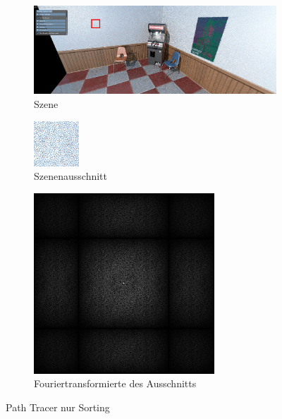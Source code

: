 \begin{figure}[H]

    \begin{subfigure}{\textwidth}
        \centering \includegraphics[scale=.2]{content/TemporalerAlg/Bilder/blue_noise_sorting.png}
        \caption{Szene}
        \label{fig:Szene_white_noise}
    \end{subfigure}
    \begin{subfigure}{0.5\textwidth}
        \centering \includegraphics[width=0.5\linewidth]{content/TemporalerAlg/Bilder/blue_noise_sorting_64x64.jpg} 
        \caption{Szenenausschnitt}
        \label{fig:ausschnitt_white_noise}
    \end{subfigure}
    \begin{subfigure}{0.5\textwidth}
        \centering \includegraphics[width=0.5\linewidth]{content/TemporalerAlg/Bilder/blue_noise_sorting_64x64_fourier.png}
        \caption{Fouriertransformierte des Ausschnitts}
        \label{fig:Fouriertransformierte_blue_noise_sorting}
    \end{subfigure}
        \caption{Path Tracer nur Sorting}
        \label{fig:blue noise szene}
\end{figure}